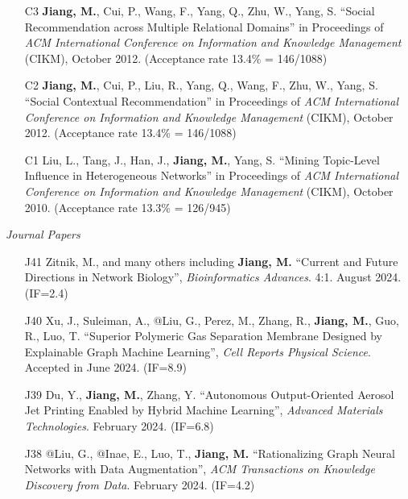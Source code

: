 \documentclass[10pt]{article}
\newenvironment{myindentpar}[1]%
{\begin{list}{}%
         {\setlength{\leftmargin}{#1}}%
         \item[]%
}
{\end{list}}
\newcounter{list}
\begin{document}
\begin{myindentpar}{0.00cm}
\begin{enumerate}[leftmargin=.5cm]
\item[C3] \textbf{Jiang, M.}, Cui, P., Wang, F., Yang, Q., Zhu, W., Yang, S. ``Social Recommendation across Multiple Relational Domains'' in Proceedings of \textit{ACM International Conference on Information and Knowledge Management} (CIKM), October 2012. (Acceptance rate 13.4\% = 146/1088)

\item[C2] \textbf{Jiang, M.}, Cui, P., Liu, R., Yang, Q., Wang, F., Zhu, W., Yang, S. ``Social Contextual Recommendation'' in Proceedings of \textit{ACM International Conference on Information and Knowledge Management} (CIKM), October 2012. (Acceptance rate 13.4\% = 146/1088)

\item[C1] Liu, L., Tang, J., Han, J., \textbf{Jiang, M.}, Yang, S. ``Mining Topic-Level Influence in Heterogeneous Networks'' in Proceedings of \textit{ACM International Conference on Information and Knowledge Management} (CIKM), October 2010. (Acceptance rate 13.3\% = 126/945)

\end{enumerate}

\hspace{-0.25cm}\textit{Journal Papers}

\begin{enumerate}[leftmargin=.5cm]

\item[J41] Zitnik, M., and many others including \textbf{Jiang, M.} ``Current and Future Directions in Network Biology'', \textit{Bioinformatics Advances}. 4:1. August 2024. (IF=2.4)

\item[J40] Xu, J., Suleiman, A., @Liu, G., Perez, M., Zhang, R., \textbf{Jiang, M.}, Guo, R., Luo, T. ``Superior Polymeric Gas Separation Membrane Designed by Explainable Graph Machine Learning'', \textit{Cell Reports Physical Science}. Accepted in June 2024. (IF=8.9)
	
\item[J39] Du, Y., \textbf{Jiang, M.}, Zhang, Y. ``Autonomous Output-Oriented Aerosol Jet Printing Enabled by Hybrid Machine Learning'', \textit{Advanced Materials Technologies}. February 2024. (IF=6.8)

\item[J38] @Liu, G., @Inae, E., Luo, T., \textbf{Jiang, M.} ``Rationalizing Graph Neural Networks with Data Augmentation'', \textit{ACM Transactions on Knowledge Discovery from Data}. February 2024. (IF=4.2)


\end{enumerate}
\end{myindentpar}
\end{document}
